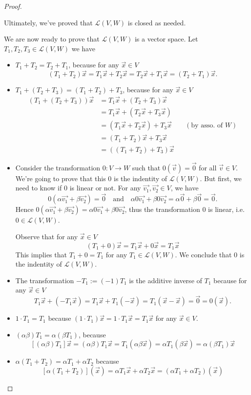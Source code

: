 \begin{proof}
\begin{itemize}
      Ultimately, we've proved that $\mathcal{L}(V,W)$ is closed as needed.
  \end{itemize}
  We are now ready to prove that $\mathcal{L}(V,W)$ is a vector space.
  Let $T_1,T_2,T_3\in\mathcal{L}(V,W)$ we have
  \begin{itemize}
    \item $T_1+T_2=T_2+T_1$, because for any $\vec{x}\in V$
      \[ (T_1+T_2)\vec{x}=T_1\vec{x}+T_2\vec{x}=T_2\vec{x}+T_1\vec{x}=(T_2+T_1)\vec{x}. \]
    \item $T_1+(T_2+T_3)=(T_1+T_2)+T_3$, because for any $\vec{x}\in V$
      \begin{align*}
        (T_1+(T_2+T_3))\vec{x}
        &=T_1\vec{x}+(T_2+T_3)\vec{x}\\
        &=T_1\vec{x}+(T_2\vec{x}+T_3\vec{x})\\
        &=(T_1\vec{x}+T_2\vec{x})+T_3\vec{x} && (\text{by asso. of $W$})\\
        &=(T_1+T_2)\vec{x}+T_3\vec{x}\\
        &=((T_1+T_2)+T_3)\vec{x}
      \end{align*}
    \item Consider the transformation $0:V\to W$ such that
      $0(\vec{v})=\vec{0}$ for all $\vec{v}\in V$. We're going to prove that
      this $0$ is the indentity of $\mathcal{L}(V,W)$. But first, we need to 
      know if $0$ is  linear or not. For any $\vec{v_1},\vec{v_2}\in V$, we have
      \[
        0(\alpha\vec{v_1}+\beta\vec{v_2})=\vec{0}
        \quad\text{and}\quad
        \alpha 0\vec{v_1}+\beta 0\vec{v_2}=\alpha\vec{0}+\beta\vec{0}=\vec{0}.
      \]
      Hence $0(\alpha\vec{v_1}+\beta\vec{v_2})=\alpha 0\vec{v_1}+\beta 0\vec{v_2}$,
      thus the transformation $0$ is linear, i.e. $0\in\mathcal{L}(V,W)$.

      Observe that for any $\vec{x}\in V$
      \[(T_1+0)\vec{x}=T_1\vec{x}+0\vec{x}=T_1\vec{x}\]
      This implies that $T_1+0=T_1$ for any $T_1\in\mathcal{L}(V,W)$.
      We conclude that $0$ is the indentity of $\mathcal{L}(V,W)$.
    \item The transformation $-T_1:=(-1)T_1$ is the additive inverse of $T_1$
      because for any $\vec{x}\in V$
      \[T_1\vec{x}+(-T_1\vec{x})=T_1\vec{x}+T_1(-\vec{x})=T_1(\vec{x}-\vec{x})=\vec{0}=0(\vec{x}).\]
    \item $1\cdot T_1=T_1$ because  $(1\cdot T_1)\vec{x}=1\cdot T_1\vec{x}=T_1\vec{x}$
      for any $\vec{x}\in V$.
    \item $(\alpha\beta)T_1=\alpha (\beta T_1)$, because 
      \[ 
        [(\alpha \beta)T_1]\vec{x}=(\alpha\beta)T_1\vec{x}=T_1(\alpha\beta\vec{x})
        =\alpha T_1(\beta\vec{x})=\alpha (\beta T_1)\vec{x}
      \]
    \item $\alpha (T_1+T_2)=\alpha T_1+\alpha T_2$ because
      \[
        [\alpha(T_1+T_2)](\vec{x})=\alpha T_1\vec{x}+\alpha T_2\vec{x}=(\alpha T_1+\alpha T_2)(\vec{x})
      \]
  \end{itemize}
\end{proof}

